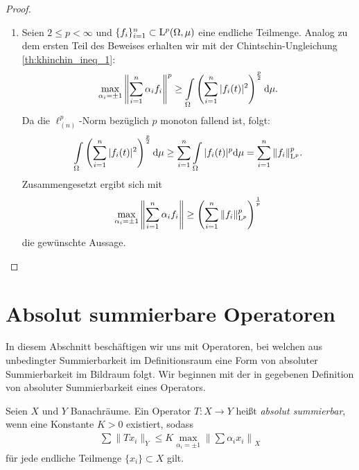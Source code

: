 \begin{proof}
\begin{enumerate}
		\item 
		Seien $ 2 \leq p < \infty $ und $ \{f_i\}_{i = 1}^n \subset \mathrm{L}^p(\Omega,\mu)$ eine endliche Teilmenge.
		Analog zu dem ersten Teil des Beweises erhalten wir mit der Chintschin-Ungleichung \ref{th:khinchin_ineq_1}:
		\begin{align*}
			\max \limits_{\alpha_i = \pm 1 }
			\left\|
			\sum \limits_{i = 1}^n \alpha_i f_i
			\right\|^p
			\geq 
			\int \limits_\Omega
			\left(
			\sum \limits_{i = 1}^n
			|f_i(t)|^2
			\right)^\frac{p}{2}
			\mathrm{d}\mu.
		\end{align*}
		Da die $ \ell^{p}_{(n)} $-Norm bezüglich $ p $ monoton fallend ist, folgt:	
		\begin{align*}	
			\int \limits_\Omega
			\left(
			\sum \limits_{i = 1}^n
			|f_i(t)|^2
			\right)^\frac{p}{2}
			\mathrm{d}\mu
			\geq 
			\sum \limits_{i = 1}^n
			\int \limits_\Omega
			|f_i(t)|^p
			\mathrm{d}\mu
			= 
			\sum \limits_{i = 1}^n \|f_i \|_{\mathrm{L}^p}^p.
		\end{align*}
		Zusammengesetzt ergibt sich mit
		\begin{align*}
			\max \limits_{\alpha_i = \pm 1 }
			\left\|
			\sum \limits_{i = 1}^n \alpha_i f_i
			\right\|
			\geq 
			\left(
			\sum \limits_{i = 1}^n \|f_i \|_{\mathrm{L}^p}^p
			\right)^\frac{1}{p}
		\end{align*}
		die gewünschte Aussage.
	\end{enumerate}
\end{proof}

\section{Absolut summierbare Operatoren}\label{sc:abs_summing}
In diesem Abschnitt beschäftigen wir uns mit Operatoren, bei welchen aus unbedingter Summierbarkeit im Definitionsraum eine Form von absoluter Summierbarkeit im Bildraum folgt.
Wir beginnen mit der in \cite{Kadets1997} gegebenen Definition von absoluter Summierbarkeit eines Operators.
\begin{df}
	Seien $ X $ und $ Y $ Banachräume.
	Ein Operator $ T : X \to Y $ heißt \textit{absolut summierbar}, wenn eine Konstante $ K > 0$ existiert, sodass
	\begin{align}\label{eq:abs_sum_cond}
		\sum \| T x_i \|_Y \leq K \max \limits_{\alpha_i = \pm 1} \left\| \sum \alpha_i x_i \right\|_X
	\end{align}
	für jede endliche Teilmenge $ \{ x_i\} \subset X $ gilt.
\end{df}

